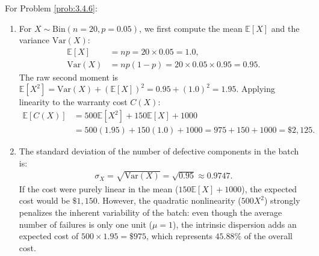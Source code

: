 \begin{solucion}
	\label{sol:3.4.6}
	For Problem \ref{prob:3.4.6}:
	\begin{enumerate}
		\item For $X \sim \text{Bin}(n=20, p=0.05)$, we first compute the mean $\mathbb{E}[X]$ and the variance $\text{Var}(X)$:
		\begin{align*}
			\mathbb{E}[X] &= np = 20 \times 0.05 = 1.0, \\
			\text{Var}(X) &= np(1-p) = 20 \times 0.05 \times 0.95 = 0.95.
		\end{align*}
		The raw second moment is $\mathbb{E}[X^2] = \text{Var}(X) + (\mathbb{E}[X])^2 = 0.95 + (1.0)^2 = 1.95$. Applying linearity to the warranty cost $C(X)$:
		\begin{align*}
			\mathbb{E}[C(X)] &= 500 \mathbb{E}[X^2] + 150 \mathbb{E}[X] + 1000 \\
			&= 500(1.95) + 150(1.0) + 1000 = 975 + 150 + 1000 = \$2,125.
		\end{align*}
		\item The standard deviation of the number of defective components in the batch is:
		\begin{align*}
			\sigma_X = \sqrt{\text{Var}(X)} = \sqrt{0.95} \approx 0.9747.
		\end{align*}
		If the cost were purely linear in the mean ($150 \mathbb{E}[X] + 1000$), the expected cost would be $\$1,150$. However, the quadratic nonlinearity ($500 X^2$) strongly penalizes the inherent variability of the batch: even though the average number of failures is only one unit ($\mu=1$), the intrinsic dispersion adds an expected cost of $500 \times 1.95 = \$975$, which represents $45.88\%$ of the overall cost.
	\end{enumerate}
\end{solucion}


